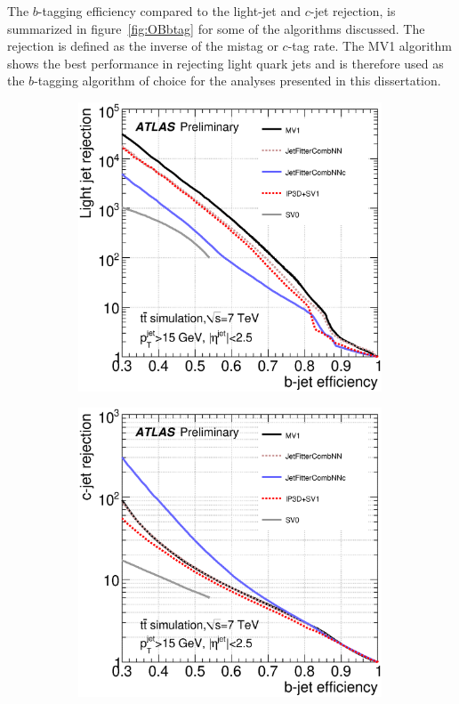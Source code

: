 The $b$-tagging efficiency compared to the light-jet and $c$-jet rejection, is summarized in figure~\ref{fig:OBbtag} for some of the algorithms discussed. The rejection is defined as the inverse of the mistag or $c$-tag rate.
The MV1 algorithm shows the best performance in rejecting light quark jets and is therefore used as the $b$-tagging algorithm of choice for the analyses presented in this dissertation.

\begin{figure}[tb!] %
\centering
\begin{subfigure}[]{0.40\textwidth}
   \includegraphics[width=0.99\textwidth]{Objects/Figures/fig_01a_bTagging.eps}
\caption{}
\end{subfigure}
\begin{subfigure}[]{0.40\textwidth}
   \includegraphics[width=0.99\textwidth]{Objects/Figures/fig_01b_bTagging.eps}

\end{subfigure}
\end{figure}

